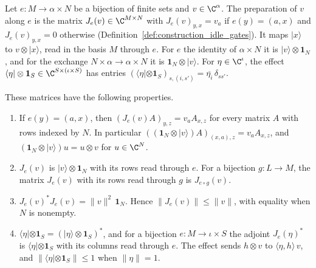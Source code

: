 \begin{definition}
    \label{def:party_effect_matrices}
    \leanok
    Let $e:M\to\alpha\times N$ be a bijection of finite sets and
    $v\in\C^\alpha$. The preparation of $v$ along $e$ is the matrix
    $J_e(v)\in\C^{M\times N}$ with $J_e(v)_{y,x}=v_a$ if $e(y)=(a,x)$ and
    $J_e(v)_{y,x}=0$ otherwise
    (Definition~\ref{def:construction_idle_gates}). It maps $|x\rangle$ to
    $v\otimes|x\rangle$, read in the basis $M$ through $e$. For $e$ the
    identity of $\alpha\times N$ it is $|v\rangle\otimes\mathbf 1_N$, and
    for the exchange $N\times\alpha\to\alpha\times N$ it is
    $\mathbf 1_N\otimes|v\rangle$. For $\eta\in\C^\iota$, the effect
    $\langle\eta|\otimes\mathbf 1_S\in\C^{S\times(\iota\times S)}$ has
    entries
    $(\langle\eta|\otimes\mathbf 1_S)_{s,(i,s')}=\overline{\eta_i}\,\delta_{ss'}$.

    These matrices have the following properties.
    \begin{enumerate}
        \item If $e(y)=(a,x)$, then $(J_e(v)A)_{y,z}=v_aA_{x,z}$ for every
              matrix $A$ with rows indexed by $N$. In particular
              $((\mathbf 1_N\otimes|v\rangle)A)_{(x,a),z}=v_aA_{x,z}$, and
              $(\mathbf 1_N\otimes|v\rangle)u=u\otimes v$ for
              $u\in\C^N$.
        \item $J_e(v)$ is $|v\rangle\otimes\mathbf 1_N$ with its rows read
              through $e$. For a bijection $g:L\to M$, the matrix $J_e(v)$
              with its rows read through $g$ is $J_{e\circ g}(v)$.
        \item $J_e(v)^*J_e(v)=\lVert v\rVert^2\,\mathbf 1_N$. Hence
              $\lVert J_e(v)\rVert\le\lVert v\rVert$, with equality when
              $N$ is nonempty.
        \item $\langle\eta|\otimes\mathbf 1_S
                  =(|\eta\rangle\otimes\mathbf 1_S)^*$, and for a bijection
              $e:M\to\iota\times S$ the adjoint $J_e(\eta)^*$ is
              $\langle\eta|\otimes\mathbf 1_S$ with its columns read through
              $e$. The effect sends $h\otimes v$ to
              $\langle\eta,h\rangle\,v$, and
              $\lVert\langle\eta|\otimes\mathbf 1_S\rVert\le1$ when
              $\lVert\eta\rVert=1$.
    \end{enumerate}
\end{definition}

